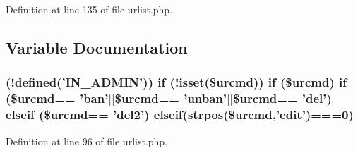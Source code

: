 Definition at line 135 of file urlist.\+php.



\subsection{Variable Documentation}
\hypertarget{urlist_8php_a77f52b43f81ed05a41b68c2161789055}{
\subsubsection[{elseif}]{ (!defined('{\bf I\+N\+\_\+\+A\+D\+M\+I\+N}')) {\bf if} (!isset(\$urcmd)) {\bf if} (\$urcmd) {\bf if} (\$urcmd== 'ban'$\vert$$\vert$\$urcmd== 'unban'$\vert$$\vert$\$urcmd== 'del') elseif (\$urcmd== 'del2') elseif(strpos(\$urcmd,'edit')===0)}}\label{urlist_8php_a77f52b43f81ed05a41b68c2161789055}


Definition at line 96 of file urlist.\+php.

